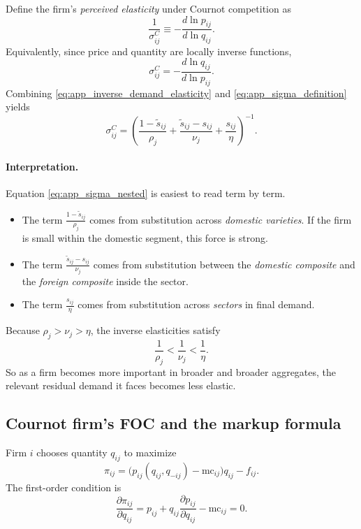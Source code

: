 Define the firm's \emph{perceived elasticity} under Cournot competition as
\begin{equation}
\frac{1}{\sigma_{ij}^C}
\equiv
- \frac{d \ln p_{ij}}{d \ln q_{ij}}.
\label{eq:app_sigma_definition}
\end{equation}
Equivalently, since price and quantity are locally inverse functions,
\[
\sigma_{ij}^C
=
- \frac{d \ln q_{ij}}{d \ln p_{ij}}.
\]
Combining \eqref{eq:app_inverse_demand_elasticity} and \eqref{eq:app_sigma_definition} yields
\begin{equation}
\sigma_{ij}^C
=
\left(
\frac{1-\tilde{s}_{ij}}{\rho_j}
+
\frac{\tilde{s}_{ij} - s_{ij}}{\nu_j}
+
\frac{s_{ij}}{\eta}
\right)^{-1}.
\label{eq:app_sigma_nested}
\end{equation}

\paragraph{Interpretation.}
Equation \eqref{eq:app_sigma_nested} is easiest to read term by term.
\begin{itemize}
    \item The term $\frac{1-\tilde{s}_{ij}}{\rho_j}$ comes from substitution across \emph{domestic varieties}. If the firm is small within the domestic segment, this force is strong.
    \item The term $\frac{\tilde{s}_{ij}-s_{ij}}{\nu_j}$ comes from substitution between the \emph{domestic composite} and the \emph{foreign composite} inside the sector.
    \item The term $\frac{s_{ij}}{\eta}$ comes from substitution across \emph{sectors} in final demand.
\end{itemize}
Because $\rho_j > \nu_j > \eta$, the inverse elasticities satisfy
\[
\frac{1}{\rho_j} < \frac{1}{\nu_j} < \frac{1}{\eta}.
\]
So as a firm becomes more important in broader and broader aggregates, the relevant residual demand it faces becomes less elastic.

\subsection{Cournot firm's FOC and the markup formula}

Firm $i$ chooses quantity $q_{ij}$ to maximize
\[
\pi_{ij}
=
\bigl(p_{ij}(q_{ij},q_{-ij}) - \text{mc}_{ij}\bigr) q_{ij} - f_{ij}.
\]
The first-order condition is
\begin{equation}
\frac{\partial \pi_{ij}}{\partial q_{ij}}
=
p_{ij}
+ q_{ij} \frac{\partial p_{ij}}{\partial q_{ij}}
- \text{mc}_{ij}
=
0.
\label{eq:app_cournot_foc}
\end{equation}

